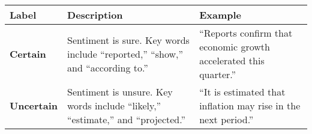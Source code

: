 \begin{table*}
    \caption{}
    \vspace{1em}
    \begin{tabular}{p{}p{}p{}}
    \toprule
    \textbf{Label} & \textbf{Description} & \textbf{Example}\\
    \midrule
    \textbf{Certain} & Sentiment is sure. Key words include “reported,” “show,” and “according to.” & “Reports confirm that economic growth accelerated this quarter.”\\
    \midrule
    \textbf{Uncertain} & Sentiment is unsure. Key words include “likely,” “estimate,” and “projected.” & “It is estimated that inflation may rise in the next period.”\\
    \bottomrule
    \end{tabular}
    \label{tb:bom_certainty_guide}
\end{table*}